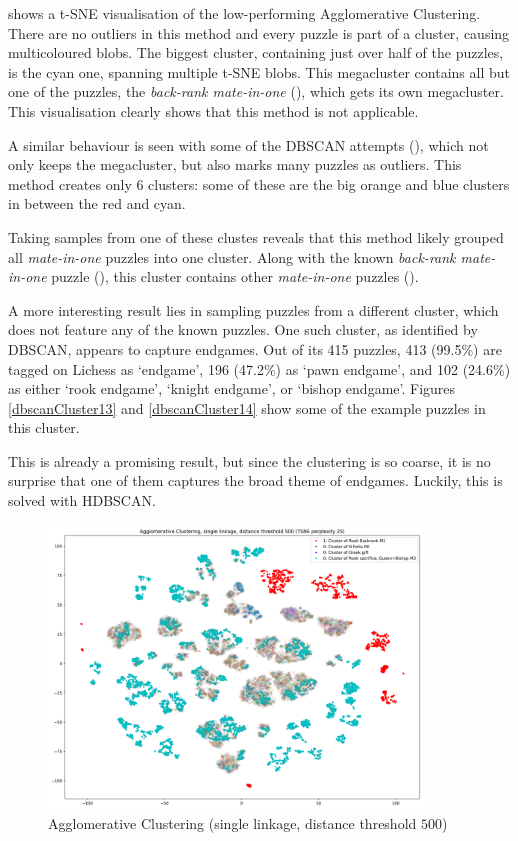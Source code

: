  shows a t-SNE visualisation of the low-performing Agglomerative
Clustering. There are no outliers in this method and every puzzle is part of a
cluster, causing multicoloured blobs. The biggest cluster, containing just over
half of the puzzles, is the cyan one, spanning multiple t-SNE blobs. This
megacluster contains all but one of the puzzles, the \emph{back-rank
mate-in-one} (), which gets its own megacluster. This
visualisation clearly shows that this method is not applicable.

A similar behaviour is seen with some of the DBSCAN attempts (),
which not only keeps the megacluster, but also marks many puzzles as outliers.
This method creates only 6 clusters: some of these are the big orange and blue
clusters in between the red and cyan.

Taking samples from one of these clustes reveals that this method likely
grouped all \emph{mate-in-one} puzzles into one cluster. Along with the known
\emph{back-rank mate-in-one} puzzle (), this cluster contains
other \emph{mate-in-one} puzzles ().

A more interesting result lies in sampling puzzles from a different cluster,
which does not feature any of the known puzzles. One such cluster, as
identified by DBSCAN, appears to capture endgames. Out of its 415 puzzles, 413
(99.5\%) are tagged on Lichess as `endgame', 196 (47.2\%) as `pawn endgame',
and 102 (24.6\%) as either `rook endgame', `knight endgame', or `bishop
endgame'. Figures \ref{dbscanCluster13} and \ref{dbscanCluster14} show some of
the example puzzles in this cluster.

This is already a promising result, but since the clustering is so coarse, it
is no surprise that one of them captures the broad theme of endgames. Luckily,
this is solved with HDBSCAN.

\begin{figure}[H]
  \centering
  \includegraphics[width=0.9\textwidth]{project/img/tsne/ac_25.png}
  \caption{Agglomerative Clustering (single linkage, distance threshold $500$)}
  \label{tsne1}
\end{figure}


